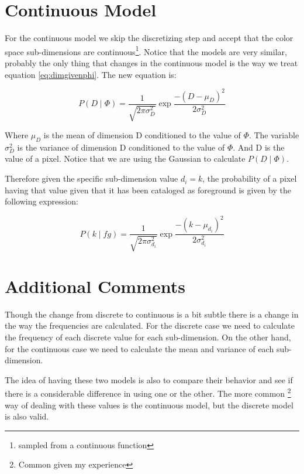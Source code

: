 \documentclass[a4paper,12pt]{report}
\begin{document}
\section{Continuous Model}
For the continuous model we skip the discretizing step and accept that the
color space sub-dimensions are continuous\footnote{sampled from
a continuous function}. Notice that the models are very similar, probably the
only thing that changes in the continuous model is the way we treat equation
\ref{eq:dimgivenphi}. The new equation is:

\begin{equation}\label{eq:dimgivenphigauss}
    P(D \mid \Phi) = \frac{1}{\sqrt{2 \pi \sigma_D^2}}
                       \exp{\frac{-(D - \mu_D)^2}{2 \sigma_D^2}}
\end{equation}

Where $\mu_D$ is the mean of dimension D conditioned to the value of $\Phi$. The
variable $\sigma_D^2$ is the variance of dimension D conditioned to the value of
$\Phi$. And D is the value of a pixel. Notice that we are using the Gaussian to
calculate $P(D \mid \Phi)$.

Therefore given the specific sub-dimension value $d_i=k$, the probability of a
pixel having that value given that it has been cataloged as foreground is given
by the following expression:

\begin{equation}\label{eq:dimgivenphigauss}
    P(k \mid fg) = \frac{1}{\sqrt{2 \pi \sigma_{d_i}^2}}
                   \exp{\frac{-(k - \mu_{d_i})^2}{2 \sigma_{d_i}^2}}
\end{equation}

\section{Additional Comments}
Though the change from discrete to continuous is a bit subtle there is a change
in the way the frequencies are calculated. For the discrete case we need to
calculate the frequency of each discrete value for each sub-dimension. On the
other hand, for the continuous case we need to calculate the mean and variance
of each sub-dimension.

The idea of having these two models is also to compare their behavior and see if
there is a considerable difference in using one or the other. The more common
\footnote{Common given my experience} way of dealing with these values is the
continuous model, but the discrete model is also valid.

\listoffixmes
\end{document}
